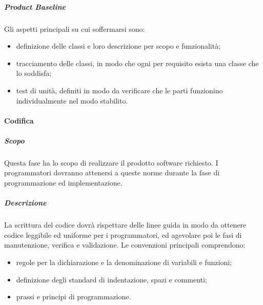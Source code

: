 \documentclass[]{article}
\begin{document}
						\subparagraph{Product Baseline} %
						Gli aspetti principali su cui soffermarsi sono:
						\begin{itemize}
							\item definizione delle classi e loro descrizione per scopo e funzionalità;
							\item tracciamento delle classi, in modo che ogni per requisito esista una classe che lo soddisfa;
							\item test di unità, definiti in modo da verificare che le parti funzionino individualmente nel modo stabilito.
						\end{itemize} 
					
					\paragraph{Codifica} %
						\subparagraph{Scopo} %
						Questa fase ha lo scopo di realizzare il prodotto software richiesto. I programmatori dovranno attenersi a queste norme durante la fase di programmazione ed implementazione.
						\subparagraph{Descrizione} %
						La scrittura del codice dovrà rispettare delle linee guida in modo da ottenere codice leggibile ed uniforme per i programmatori, ed agevolare poi le fasi di manutenzione, verifica e validazione. Le convenzioni principali comprendono:
						\begin{itemize}
							\item regole per la dichiarazione e la denominazione di variabili e funzioni;
							\item definizione degli standard di indentazione, spazi e commenti;
							\item prassi e principi di programmazione.
						\end{itemize}
						
\end{document}
